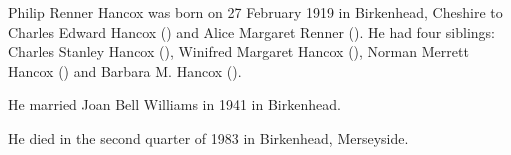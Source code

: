 
Philip Renner Hancox was born on 27 February 1919 in	Birkenhead, Cheshire to Charles Edward Hancox () and Alice Margaret Renner ()\cite{PRHancoxBirth}.  He had four siblings: Charles Stanley Hancox (), Winifred Margaret Hancox (), Norman Merrett Hancox () and Barbara M. Hancox ().

He married Joan Bell Williams in 1941 in Birkenhead. \cite{PRHancoxMarriage}

He died in the second quarter of 1983 in Birkenhead, Merseyside.\cite{PRHancoxDeath}



